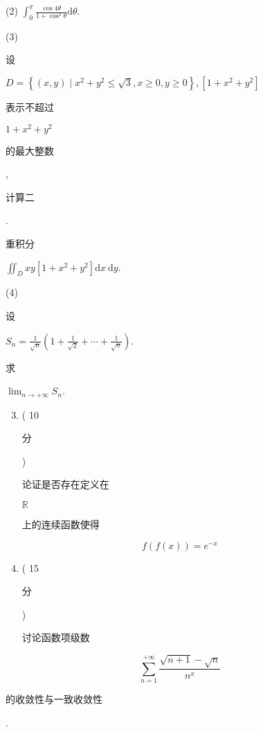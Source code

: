 \documentclass[10pt]{article}
\begin{document}
(2) $\int_{0}^{\pi} \frac{\cos 4 \theta}{1+\cos ^{2} \theta} \mathrm{d} \theta$.

(3) \begin{CJK}{UTF8}{mj}设\end{CJK} $D=\left\{(x, y) \mid x^{2}+y^{2} \leqslant \sqrt{3}, x \geqslant 0, y \geqslant 0\right\},\left[1+x^{2}+y^{2}\right]$ \begin{CJK}{UTF8}{mj}表示不超过\end{CJK} $1+x^{2}+y^{2}$ \begin{CJK}{UTF8}{mj}的最大整数\end{CJK}, \begin{CJK}{UTF8}{mj}计算二\end{CJK}. \begin{CJK}{UTF8}{mj}重积分\end{CJK} $\iint_{D} x y\left[1+x^{2}+y^{2}\right] \mathrm{d} x \mathrm{~d} y$.

(4) \begin{CJK}{UTF8}{mj}设\end{CJK} $S_{n}=\frac{1}{\sqrt{n}}\left(1+\frac{1}{\sqrt{2}}+\cdots+\frac{1}{\sqrt{n}}\right)$. \begin{CJK}{UTF8}{mj}求\end{CJK} $\lim _{n \rightarrow+\infty} S_{n}$.

\begin{enumerate}
  \setcounter{enumi}{2}
  \item ( 10 \begin{CJK}{UTF8}{mj}分\end{CJK}) \begin{CJK}{UTF8}{mj}论证是否存在定义在\end{CJK} $\mathbb{R}$ \begin{CJK}{UTF8}{mj}上的连续函数使得\end{CJK}
\end{enumerate}
$$
f(f(x))=e^{-x}
$$

\begin{enumerate}
  \setcounter{enumi}{3}
  \item ( 15 \begin{CJK}{UTF8}{mj}分\end{CJK}) \begin{CJK}{UTF8}{mj}讨论函数项级数\end{CJK}
\end{enumerate}
$$
\sum_{n=1}^{+\infty} \frac{\sqrt{n+1}-\sqrt{n}}{n^{x}}
$$
\begin{CJK}{UTF8}{mj}的收敛性与一致收敛性\end{CJK}.
\end{document}

